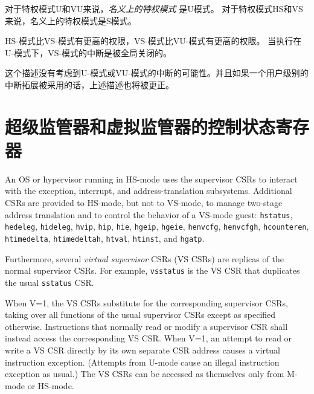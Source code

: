 对于特权模式U和VU来说，\textit{名义上的特权模式} 是U模式。
对于特权模式HS和VS来说，名义上的特权模式是S模式。

HS-模式比VS-模式有更高的权限，VS-模式比VU-模式有更高的权限。
当执行在U-模式下，VS-模式的中断是被全局关闭的。

\begin{commentary}

这个描述没有考虑到U-模式或VU-模式的中断的可能性。并且如果一个用户级别的中断拓展被采用的话，上述描述也将被更正。
\end{commentary}


\section{超级监管器和虚拟监管器的控制状态寄存器}

An OS or hypervisor running in HS-mode uses the supervisor CSRs to interact with the exception,
interrupt, and address-translation subsystems.
Additional CSRs are provided to HS-mode, but not to VS-mode, to manage
two-stage address translation and to control the behavior of a VS-mode guest:
{\tt hstatus}, {\tt hedeleg}, {\tt hideleg}, {\tt hvip}, {\tt hip}, {\tt hie},
{\tt hgeip}, {\tt hgeie}, {\tt henvcfg}, {\tt henvcfgh},
{\tt hcounteren}, {\tt htimedelta}, {\tt htimedeltah}, {\tt htval},
{\tt htinst}, and {\tt hgatp}.

Furthermore, several {\em virtual supervisor} CSRs (VS CSRs) are replicas
of the normal supervisor CSRs.
For example, {\tt vsstatus} is the VS CSR that duplicates the usual
{\tt sstatus} CSR.

When V=1, the VS CSRs substitute for the corresponding supervisor CSRs,
taking over all functions of the usual supervisor CSRs except as specified
otherwise.
Instructions that normally read or modify a supervisor CSR shall instead
access the corresponding VS CSR.
When V=1, an attempt to read or write a VS CSR directly by its own
separate CSR address causes a virtual instruction exception.
(Attempts from U-mode cause an illegal instruction exception as usual.)
The VS CSRs can be accessed as themselves only from M-mode or HS-mode.

